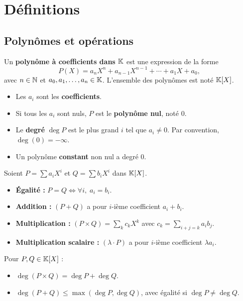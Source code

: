 \section{Définitions}

\subsection{Polynômes et opérations}

\begin{defbox}[--- Polynôme]
Un \textbf{polynôme à coefficients dans $\mathbb{K}$} est une expression de la forme
\[
  P(X) = a_n X^n + a_{n-1} X^{n-1} + \cdots + a_1 X + a_0,
\]
avec $n \in \mathbb{N}$ et $a_0, a_1, \ldots, a_n \in \mathbb{K}$. L'ensemble des polynômes est noté $\mathbb{K}[X]$.

\begin{itemize}[leftmargin=1cm]
  \item Les $a_i$ sont les \textbf{coefficients}.
  \item Si tous les $a_i$ sont nuls, $P$ est le \textbf{polynôme nul}, noté $0$.
  \item Le \textbf{degré} $\deg P$ est le plus grand $i$ tel que $a_i \neq 0$. Par convention, $\deg(0) = -\infty$.
  \item Un polynôme \textbf{constant} non nul a degré $0$.
\end{itemize}
\end{defbox}

\begin{defbox}[--- Opérations]
Soient $P = \sum a_i X^i$ et $Q = \sum b_i X^i$ dans $\mathbb{K}[X]$.
\begin{itemize}[leftmargin=1cm]
  \item \textbf{Égalité :} $P = Q \iff \forall i,\; a_i = b_i$.
  \item \textbf{Addition :} $(P + Q)$ a pour $i$-ième coefficient $a_i + b_i$.
  \item \textbf{Multiplication :} $(P \times Q) = \sum_k c_k X^k$ avec $c_k = \displaystyle\sum_{i + j = k} a_i b_j$.
  \item \textbf{Multiplication scalaire :} $(\lambda \cdot P)$ a pour $i$-ième coefficient $\lambda a_i$.
\end{itemize}
\end{defbox}

\begin{propbox}[--- Degrés]
Pour $P, Q \in \mathbb{K}[X]$ :
\begin{itemize}[leftmargin=1cm]
  \item $\deg(P \times Q) = \deg P + \deg Q$.
  \item $\deg(P + Q) \leqslant \max(\deg P, \deg Q)$, avec égalité si $\deg P \neq \deg Q$.
\end{itemize}
\end{propbox}


